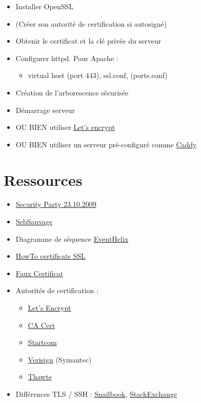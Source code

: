 \begin{itemize}
\tightlist
\item
  Installer OpenSSL
\item
  (Créer son autorité de certification si autosigné)
\item
  Obtenir le certificat et la clé privée du serveur
\item
  Configurer httpd. Pour Apache :

  \begin{itemize}
  \tightlist
  \item
    virtual host (port 443), ssl.conf, (ports.conf)
  \end{itemize}
\item
  Création de l'arborescence sécurisée
\item
  Démarrage serveur
\item
  OU BIEN utiliser \href{https://letsencrypt.org/}{Let's encrypt}
\item
  OU BIEN utiliser un serveur pré-configuré comme
  \href{https://caddyserver.com/}{Caddy}
\end{itemize}

\hypertarget{ressources}{%
\section{Ressources}\label{ressources}}

\begin{itemize}
\tightlist
\item
  \href{https://wiki.alphanet.ch/Ateliers/PresentationSecurityParty}{Security
  Party 23.10.2009}
\item
  \href{http://www.sebsauvage.net/comprendre/ssl/}{SebSauvage}
\item
  Diagramme de séquence
  \href{http://www.eventhelix.com/realtimemantra/networking/SSL.pdf}{EventHelix}
\item
  \href{http://www.win.tue.nl/hashclash/rogue-ca/}{HowTo certificats
  SSL}
\item
  \href{http://www.win.tue.nl/hashclash/rogue-ca/}{Faux Certificat}
\item
  Autorités de certification :

  \begin{itemize}
  \tightlist
  \item
    \href{https://letsencrypt.org/}{Let's Encrypt}
  \item
    \href{http://www.cacert.org/}{CA Cert}
  \item
    \href{http://www.startcom.org/}{Startcom}
  \item
    \href{https://www.verisign.com/?dmn=www.verisign.ch}{Verisign}
    (Symantec)
  \item
    \href{https://www.thawte.com/}{Thawte}
  \end{itemize}
\item
  Différences TLS / SSH :
  \href{http://www.snailbook.com/faq/ssl.auto.html}{Snailbook},
  \href{http://security.stackexchange.com/questions/1599/what-is-the-difference-between-ssl-vs-ssh-which-is-more-secure}{StackExchange}
\end{itemize}

